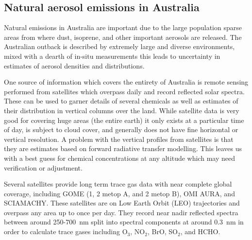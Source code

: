 \subsection{Natural aerosol emissions in Australia}
Natural emissions in Australia are important due to the large population sparse areas from where dust, isoprene, and other important aerosols are released.
The Australian outback is described by extremely large and diverse environments, mixed with a dearth of in-situ measurements this leads to uncertainty in estimates of aerosol densities and distributions.

One source of information which covers the entirety of Australia is remote sensing performed from satellites which overpass daily and record reflected solar spectra.
These can be used to garner details of several chemicals as well as estimates of their distribution in vertical columns over the land.
While satellite data is very good for covering huge areas (the entire earth) it only exists at a particular time of day, is subject to cloud cover, and generally does not have fine horizontal or vertical resolution.
A problem with the vertical profiles from satellites is that they are estimates based on forward radiative transfer modelling.
This leaves us with a best guess for chemical concentrations at any altitude which may need verification or adjustment.

Several satellites provide long term trace gas data with near complete global coverage, including GOME (1, 2 metop A, and 2 metop B), OMI AURA, and SCIAMACHY.
These satellites are on Low Earth Orbit (LEO) trajectories and overpass any area up to once per day. 
They record near nadir reflected spectra between around 250-700~nm split into spectral components at around $0.3$~nm in order to calculate trace gases including O$_3$, NO$_2$, BrO, SO$_2$, and HCHO.




  
  
  